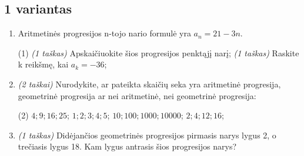\documentclass[a4paper]{article}
\begin{document}
\subsection*{1 variantas}

\begin{enumerate}
      \item Aritmetinės progresijos n-tojo nario formulė yra $a_{n}=21-3n$.

            \begin{tasks}[item-format={\normalfont}, after-item-skip=2mm](1)
                  \task \textit{(1 taškas)} Apskaičiuokite šios progresijos
                  penktąjį
                  narį;
                  \task \textit{(1 taškas)} Raskite k reikšmę, kai $a_k=-36$;
            \end{tasks}

      \item \textit{(2 taškai)} Nurodykite, ar pateikta skaičių seka yra
            aritmetinė progresija, geometrinė progresija ar nei aritmetinė, nei
            geometrinė progresija:
            \begin{tasks}[item-format={\normalfont}, after-item-skip=2mm](2)
                  \task $4; 9; 16; 25$;
                  \task $1;2;3;4;5$;
                  \task $10; 100; 1000; 10000$;
                  \task $2;4;12;16$;
            \end{tasks}

      \item \textit{(1 taškas)} Didėjančios geometrinės progresijos pirmasis
            narys lygus 2, o trečiasis lygus 18. Kam lygus antrasis šios
            progresijos narys?


\end{enumerate}
\end{document}
